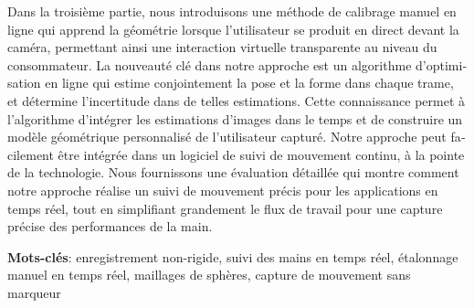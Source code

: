 \begin{otherlanguage}{french}
Dans la troisième partie, nous introduisons une méthode de calibrage manuel en ligne qui apprend la géométrie lorsque l'utilisateur se produit en direct devant la caméra, permettant ainsi une interaction virtuelle transparente au niveau du consommateur. La nouveauté clé dans notre approche est un algorithme d'optimisation en ligne qui estime conjointement la pose et la forme dans chaque trame, et détermine l'incertitude dans de telles estimations. Cette connaissance permet à l'algorithme d'intégrer les estimations d'images dans le temps et de construire un modèle géométrique personnalisé de l'utilisateur capturé. Notre approche peut facilement être intégrée dans un logiciel de suivi de mouvement continu, à la pointe de la technologie. Nous fournissons une évaluation détaillée qui montre comment notre approche réalise un suivi de mouvement précis pour les applications en temps réel, tout en simplifiant grandement le flux de travail pour une capture précise des performances de la main.

\textbf{Mots-clés}: enregistrement non-rigide, suivi des mains en temps réel, étalonnage manuel en temps réel, maillages de sphères, capture de mouvement sans marqueur

\end{otherlanguage}

